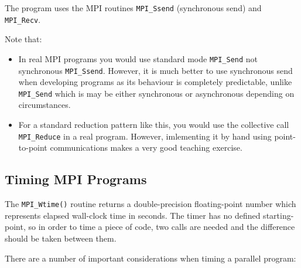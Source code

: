 \documentclass{article}
\begin{document}
  The program uses the MPI routines {\tt MPI\_Ssend} (synchronous send) and {\tt MPI\_Recv}.

Note that:

\begin{itemize}

  \item In real MPI programs you would use standard mode
    \texttt{MPI\_Send} not synchronous \texttt{MPI\_Ssend}. However, it is much better to use synchronous
    send when developing programs as its behaviour is completely
    predictable, unlike \texttt{MPI\_Send} which is may be either
    synchronous or asynchronous depending on circumstances.

    \item For a standard reduction pattern like this, you would use
      the collective call \texttt{MPI\_Reduce} in a real
      program. However, imlementing it by hand using point-to-point
      communications makes a very good teaching exercise.

\end{itemize}

\subsection{Timing MPI Programs}

The {\tt MPI\_Wtime()} routine returns a double-precision floating-point
number which represents elapsed wall-clock time in seconds. The timer
has no defined starting-point, so in order to time a piece of code, two
calls are needed and the difference should be taken between them.

There are a number of important considerations when timing a
parallel program:
\end{document}
